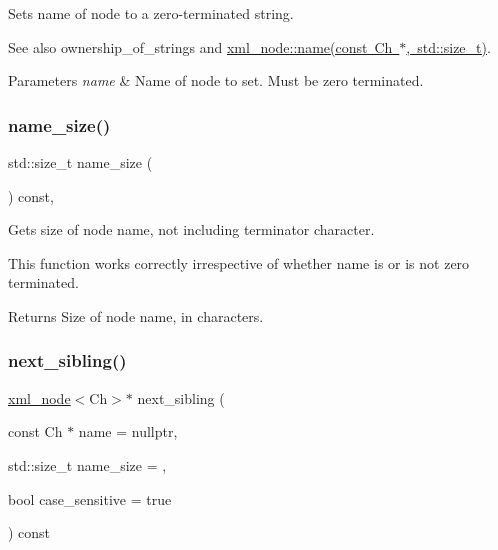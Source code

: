 Sets name of node to a zero-\/terminated string. 

See also ownership\+\_\+of\+\_\+strings and \mbox{\hyperlink{classrapidxml_1_1xml__base_a4e7e23d06d48126c65b1f6266acfba5c}{xml\+\_\+node\+::name(const Ch $\ast$, std\+::size\+\_\+t)}}. 
\begin{DoxyParams}{Parameters}
{\em name} & Name of node to set. Must be zero terminated. \\
\hline
\end{DoxyParams}
\mbox{\label{classrapidxml_1_1xml__base_ad01e2eff02202b130baad012d1ed7328}} 
\subsubsection{\texorpdfstring{name\+\_\+size()}{name\_size()}}
{\footnotesize\ttfamily std\+::size\+\_\+t name\+\_\+size (\begin{DoxyParamCaption}{ }\end{DoxyParamCaption}) const\hspace{0.3cm}{\ttfamily [inline]}, {\ttfamily [inherited]}}



Gets size of node name, not including terminator character. 

This function works correctly irrespective of whether name is or is not zero terminated. \begin{DoxyReturn}{Returns}
Size of node name, in characters. 
\end{DoxyReturn}
\mbox{\label{classrapidxml_1_1xml__node_a365211719a7337837a502699275c5db6}} 
\subsubsection{\texorpdfstring{next\+\_\+sibling()}{next\_sibling()}}
{\footnotesize\ttfamily \mbox{\hyperlink{classrapidxml_1_1xml__node}{xml\+\_\+node}}$<$Ch$>$$\ast$ next\+\_\+sibling (\begin{DoxyParamCaption}\item[{const Ch $\ast$}]{name = {\ttfamily nullptr},  }\item[{std\+::size\+\_\+t}]{name\+\_\+size = {},  }\item[{bool}]{case\+\_\+sensitive = {\ttfamily true} }\end{DoxyParamCaption}) const\hspace{0.3cm}{\ttfamily [inline]}}




